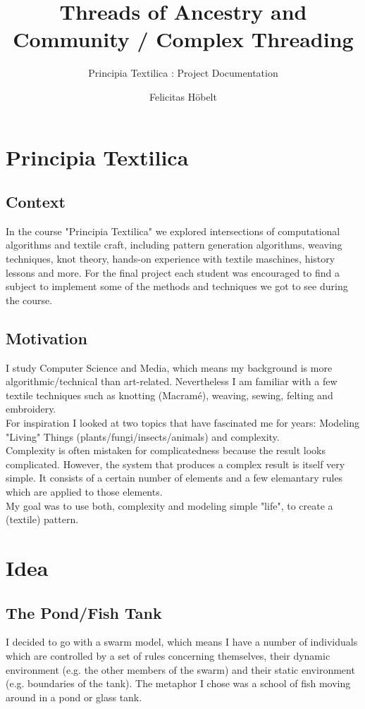 \documentclass{scrartcl}
\title{Threads of Ancestry and Community / Complex Threading}
\subtitle{Principia Textilica : Project Documentation}
\author{Felicitas Höbelt}
\begin{document}
\maketitle

\section{Principia Textilica}

\subsection{Context}
In the course "Principia Textilica" we explored intersections of computational algorithms and textile craft, including pattern generation algorithms, weaving techniques, knot theory, hands-on experience with textile maschines, history lessons and more.
For the final project each student was encouraged to find a subject to implement some of the methods and techniques we got to see during the course.

\subsection{Motivation}

I study Computer Science and Media, which means my background is more algorithmic/technical than art-related.
Nevertheless I am familiar with a few textile techniques such as knotting (Macramé), weaving, sewing, felting and embroidery.\\
For inspiration I looked at two topics that have fascinated me for years: Modeling "Living" Things (plants/fungi/insects/animals) and complexity.\\
Complexity is often mistaken for complicatedness because the result looks complicated.
However, the system that produces a complex result is itself very simple. It consists of a certain number of elements and a few elemantary rules which are applied to those elements.\\
My goal was to use both, complexity and modeling simple "life", to create a (textile) pattern.

\section{Idea}

\subsection{The Pond/Fish Tank}
I decided to go with a swarm model, which means I have a number of individuals which are controlled by a set of rules concerning themselves, their dynamic environment (e.g. the other members of the swarm) and their static environment (e.g. boundaries of the tank).
The metaphor I chose was a school of fish moving around in a pond or glass tank.
\end{document}
